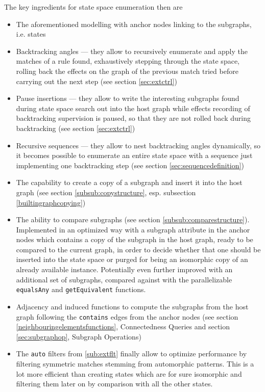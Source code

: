 The key ingredients for state space enumeration then are
\begin{itemize}
	\item The aforementioned modelling with anchor nodes linking to the subgraphs, i.e. states
	\item Backtracking angles --- they allow to recursively enumerate and apply the matches of a rule found, exhaustively stepping through the state space, rolling back the effects on the graph of the previous match tried before carrying out the next step (see section \ref{sec:extctrl})
	\item Pause insertions --- they allow to write the interesting subgraphs found during state space search out into the host graph while effects recording of backtracking supervision is paused, so that they are not rolled back during backtracking (see section \ref{sec:extctrl})
	\item Recursive sequences --- they allow to nest backtracking angles dynamically, so it becomes possible to enumerate an entire state space with a sequence just implementing one backtracking step (see section \ref{sec:sequencedefinition})
	\item The capability to create a copy of a subgraph and insert it into the host graph (see section \ref{subsub:copystructure}, esp. subsection \ref{builtingraphcopying})
	\item The ability to compare subgraphs (see section \ref{subsub:comparestructure}).
Implemented in an optimized way with a subgraph attribute in the anchor nodes which contains a copy of the subgraph in the host graph, ready to be compared to the current graph, in order to decide whether that one should be inserted into the state space or purged for being an isomorphic copy of an already available instance. Potentially even further improved with an additional set of subgraphs, compared against with the parallelizable \texttt{equalsAny} and \texttt{getEquivalent} functions.
	\item Adjacency and induced functions to compute the subgraphs from the host graph following the \texttt{contains} edges from the anchor nodes (see section \ref{neighbouringelementsfunctions}, Connectedness Queries and section \ref{sec:subgraphop}, Subgraph Operations)
	\item The \texttt{auto} filters from \ref{sub:extflt} finally allow to optimize performance by filtering symmetric matches stemming from automorphic patterns. This is a lot more efficient than creating states which are for sure isomorphic and filtering them later on by comparison with all the other states.
\end{itemize}


